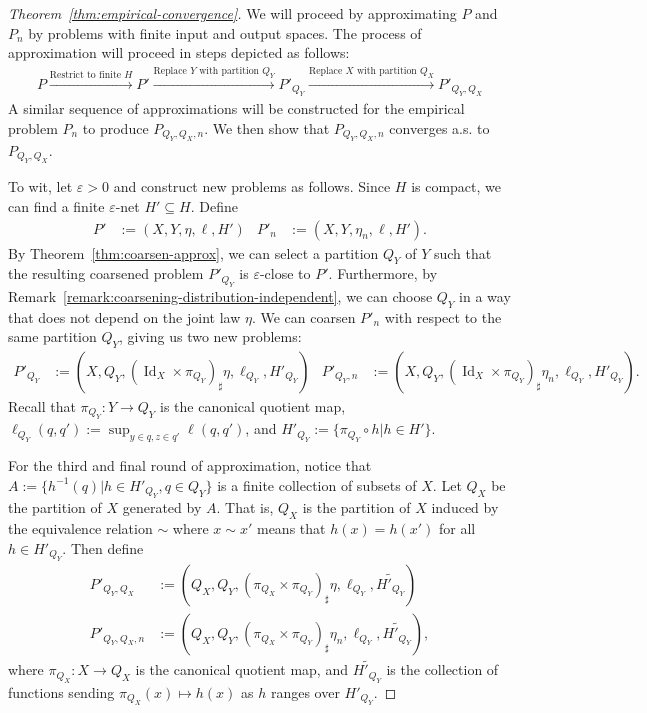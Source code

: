 \documentclass[twoside,11pt]{article}
\DeclareMathOperator{\id}{Id}
\renewcommand{\epsilon}{\varepsilon}
\begin{document}
\begin{proof}[Theorem~\ref{thm:empirical-convergence}]
    We will proceed by approximating $P$ and $P_n$ by problems with finite input and output spaces. The process of approximation will proceed in steps depicted as follows:
    \begin{align*}
        P \xrightarrow{\text{Restrict to finite $H$}} P' \xrightarrow{\text{Replace $Y$ with partition $Q_Y$}} P'_{Q_Y} \xrightarrow{\text{Replace $X$ with partition $Q_X$}} P'_{Q_Y,Q_X}
    \end{align*}
    A similar sequence of approximations will be constructed for the empirical problem $P_n$ to produce $P_{Q_Y,Q_X,n}$. We then show that $P_{Q_Y,Q_X,n}$ converges a.s. to $P_{Q_Y,Q_X}$.

    To wit, let $\epsilon > 0$ and construct new problems as follows. Since $H$ is compact, we can find a finite $\epsilon$-net $H'\subseteq H$. Define
    \begin{align*}
        P' &:= (X,Y,\eta,\ell, H')  &  P'_n &:= (X,Y,\eta_n,\ell, H').
    \end{align*}
    By Theorem~\ref{thm:coarsen-approx}, we can select a partition $Q_Y$ of $Y$ such that the resulting coarsened problem $P'_{Q_Y}$ is $\epsilon$-close to $P'$. Furthermore, by Remark~\ref{remark:coarsening-distribution-independent}, we can choose $Q_Y$ in a way that does not depend on the joint law $\eta$. We can coarsen $P'_n$ with respect to the same partition $Q_Y$, giving us two new problems:
    \begin{align*}
        P'_{Q_Y} &:= (X,Q_Y,(\id_X\times \pi_{Q_Y})_\sharp\eta,\ell_{Q_Y}, H'_{Q_Y})  &
        P'_{Q_Y,n} &:= (X,Q_Y,(\id_X\times \pi_{Q_Y})_\sharp\eta_n,\ell_{Q_Y}, H'_{Q_Y}).
    \end{align*}
    Recall that $\pi_{Q_Y}:Y\to Q_Y$ is the canonical quotient map,  $\ell_{Q_Y}(q,q') := \sup_{y \in q, z\in q'}\ell(q,q')$, and $H'_{Q_Y} := \{\pi_{Q_Y}\circ h| h\in H'\}$.

    For the third and final round of approximation, notice that
    \(A := \{h^{-1}(q) | h\in H'_{Q_Y}, q\in Q_Y\}\)
    is a finite collection of subsets of $X$. Let $Q_X$ be the partition of $X$ generated by $A$. That is, $Q_X$ is the partition of $X$ induced by the equivalence relation ${\sim}$ where $x\sim x'$ means that $h(x)=h(x')$ for all $h\in H'_{Q_Y}$.  Then define
    \begin{align*}
        P'_{Q_Y,Q_X} &:= (Q_X,Q_Y,(\pi_{Q_X}\times \pi_{Q_Y})_\sharp\eta,\ell_{Q_Y}, \widetilde{H'_{Q_Y}})
        \\
        P'_{Q_Y,Q_X,n} &:= (Q_X,Q_Y,(\pi_{Q_X}\times \pi_{Q_Y})_\sharp\eta_n,\ell_{Q_Y}, \widetilde{H'_{Q_Y}}),
    \end{align*}
    where $\pi_{Q_X}:X\to Q_X$ is the canonical quotient map, and $\widetilde{H'_{Q_Y}}$ is the collection of functions sending $\pi_{Q_X}(x) \mapsto h(x)$ as $h$ ranges over $H'_{Q_Y}$.


\end{proof}
\end{document}
